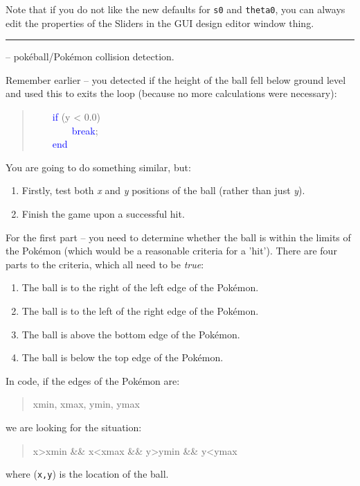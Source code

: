 \documentclass{tufte-book} %
\newenvironment{docspec}{\begin{quotation}\ttfamily\parskip0pt\parindent0pt\ignorespaces}{\end{quotation}}
\begin{document}
Note that if you do not like the new defaults for  \texttt{s0} and \texttt{theta0}, you can always edit the properties of the \textsf{Sliders} in the GUI design editor window thing.

\vspace{1mm}
\noindent\rule{4cm}{0.5pt}
\vspace{-2mm}

 -- pok\'eball/Pok\'emon collision detection.

\noindent Remember earlier -- you detected if the height of the ball fell below ground level and used this to exits the loop (because no more calculations were necessary):
\begin{docspec}
\ \ \ \    \textcolor{blue}{if} (y < 0.0)\\
\ \ \ \ \ \ \ \        \textcolor{blue}{break};\\
\ \ \ \    \textcolor{blue}{end}
\end{docspec}
You are going to do something similar, but:
\begin{enumerate}[noitemsep]
\setlength{\itemindent}{.2in}
\item Firstly, test both \textit{x} and \textit{y} positions of the ball (rather than just \textit{y}).
\item Finish the game upon a successful hit.
\end{enumerate}

For the first part -- you need to determine whether the ball is within the limits of the Pok\'emon (which would be a reasonable criteria for a 'hit'). There are four parts to the criteria, which all need to be \textit{true}:
\begin{enumerate}[noitemsep]
\setlength{\itemindent}{.2in}
\item The ball is to the right of the left edge of the Pok\'emon.
\item The ball is to the left of the right edge of the Pok\'emon.
\item The ball is above the bottom edge of the Pok\'emon.
\item The ball is below the top edge of the Pok\'emon.
\end{enumerate}
In code, if the edges of the Pok\'emon are:
\begin{docspec}
xmin, xmax, ymin, ymax
\end{docspec}
we are looking for the situation:
\begin{docspec}
x>xmin \&\& x<xmax \&\& y>ymin \&\& y<ymax
\end{docspec}
where (\texttt{x,y}) is the location of the ball.
\end{document}
